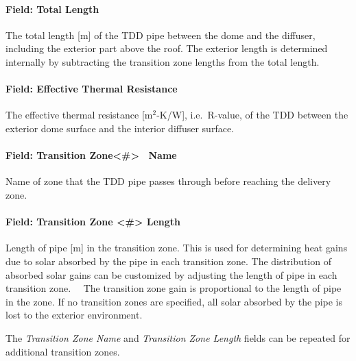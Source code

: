 \paragraph{Field: Total Length}\label{field-total-length}

The total length {[}m{]} of the TDD pipe between the dome and the diffuser, including the exterior part above the roof. The exterior length is determined internally by subtracting the transition zone lengths from the total length.

\paragraph{Field: Effective Thermal Resistance}\label{field-effective-thermal-resistance}

The effective thermal resistance {[}m\(^{2}\)-K/W{]}, i.e.~R-value, of the TDD between the exterior dome surface and the interior diffuser surface.

\paragraph{Field: Transition Zone\textless{}\#\textgreater{}~ Name}\label{field-transition-zone-name}

Name of zone that the TDD pipe passes through before reaching the delivery zone.

\paragraph{Field: Transition Zone \textless{}\#\textgreater{} Length}\label{field-transition-zone-length}

Length of pipe {[}m{]} in the transition zone. This is used for determining heat gains due to solar absorbed by the pipe in each transition zone. The distribution of absorbed solar gains can be customized by adjusting the length of pipe in each transition zone.~~ The transition zone gain is proportional to the length of pipe in the zone. If no transition zones are specified, all solar absorbed by the pipe is lost to the exterior environment.

The \emph{Transition Zone Name} and \emph{Transition Zone Length} fields can be repeated for additional transition zones.

